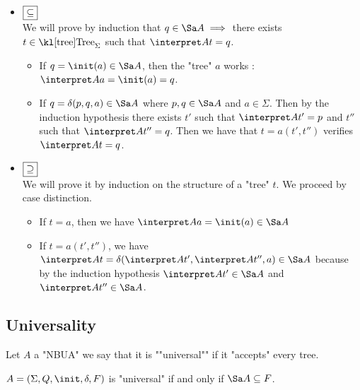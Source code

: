 \documentclass{article}
\begin{document}
\begin{proofI}
	\begin{itemize}
		\item $\fbox{$\subseteq$}$\vspace{0.15cm}\\
		      We will prove by induction that $q \in \Sa A \implies$ there exists $t \in \tree_\Sigma$ such that
		      $\interpret A t = q$.

		      \begin{itemize}
			      \item If $q = \init(a) \in \Sa A$, then the "tree" $a$ works : $\interpret A a = \init (a) = q$.
			      \item If $q = \delta (p,q,a) \in \Sa A$ where $p,q \in \Sa A$ and $a \in \Sigma$. Then by the induction hypothesis
			            there exists $t'$ such that $\interpret A {t'} = p$ and $t''$ such that $\interpret A {t''} = q$.
			            Then we have that $t = a(t',t'')$ verifies $\interpret A t = q$.
		      \end{itemize}
		\item $\fbox{$\supseteq$}$\vspace{0.15cm}\\
		      We will prove it by induction on the structure of a "tree" $t$. We proceed by case distinction.
		      \begin{itemize}
			      \item If $t = a$, then we have $ \interpret A a = \init (a) \in \Sa A$
			      \item If $t = a(t',t'')$, we have $ \interpret A t = \delta(\interpret A {t'}, \interpret A {t''}, a) \in \Sa A$
			            because by the induction hypothesis $\interpret A {t'} \in \Sa A$  and $\interpret A {t''} \in \Sa A$.
		      \end{itemize}
	\end{itemize}
\end{proofI}

\subsection{Universality}

\begin{definition}
	Let $A $ a "NBUA" we say that it is ""universal"" if it "accepts" every tree.
\end{definition}


\begin{theorem}
	$A = \DBUA$ is "universal" if and only if $\Sa A \subseteq F$.
\end{theorem}
\end{document}
